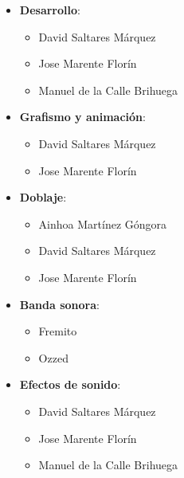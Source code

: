 \begin{itemize}
	\item \textbf{Desarrollo}:
		\begin{itemize}
			\item David Saltares Márquez
			\item Jose Marente Florín
			\item Manuel de la Calle Brihuega
		\end{itemize}		
	\item \textbf{Grafismo y animación}:
		\begin{itemize}
			\item David Saltares Márquez
			\item Jose Marente Florín
		\end{itemize}
	\item \textbf{Doblaje}:
		\begin{itemize}
			\item Ainhoa Martínez Góngora
			\item David Saltares Márquez
			\item Jose Marente Florín
		\end{itemize}
	\item \textbf{Banda sonora}:
		\begin{itemize}
			\item Fremito
			\item Ozzed
		\end{itemize}
	\item \textbf{Efectos de sonido}:
		\begin{itemize}
			\item David Saltares Márquez
			\item Jose Marente Florín
			\item Manuel de la Calle Brihuega
		\end{itemize}
\end{itemize}
